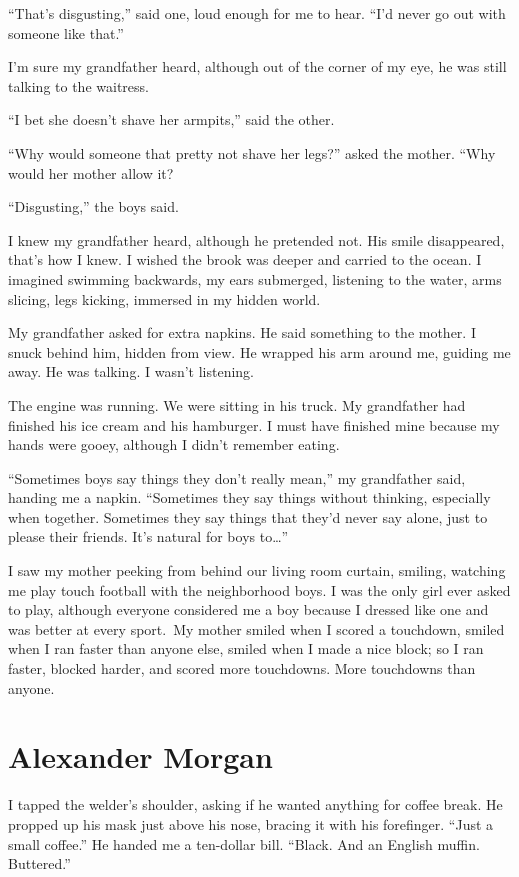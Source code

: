 ``That's disgusting,'' said one, loud enough for me to hear. ``I'd never
go out with someone like that.''

I'm sure my grandfather heard, although out of the corner of my eye, he
was still talking to the waitress.

``I bet she doesn't shave her armpits,'' said the other.

``Why would someone that pretty not shave her legs?'' asked the mother.
``Why would her mother allow it?

``Disgusting,'' the boys said. ~

I knew my grandfather heard, although he pretended not. His smile
disappeared, that's how I knew. I wished the brook was deeper and
carried to the ocean. I imagined swimming backwards, my ears submerged,
listening to the water, arms slicing, legs kicking, immersed in my
hidden world.

My grandfather asked for extra napkins. He said something to the mother.
I snuck behind him, hidden from view. He wrapped his arm around me,
guiding me away. He was talking. I wasn't listening.

The engine was running. We were sitting in his truck. My grandfather had
finished his ice cream and his hamburger. I must have finished mine
because my hands were gooey, although I didn't remember eating. ~

``Sometimes boys say things they don't really mean,'' my grandfather
said, handing me a napkin. ``Sometimes they say things without thinking,
especially when together. Sometimes they say things that they'd never
say alone, just to please their friends. It's natural for boys
to\ldots{}''

I saw my mother peeking from behind our living room curtain, smiling,
watching me play touch football with the neighborhood boys. I was the
only girl ever asked to play, although everyone considered me a boy
because I dressed like one and was better at every sport.~My mother
smiled when I scored a touchdown, smiled when I ran faster than anyone
else, smiled when I made a nice block; so I ran faster, blocked harder,
and scored more touchdowns. More touchdowns than anyone.

\chapter{Alexander Morgan}

\titlemark

I tapped the welder's shoulder, asking if he wanted anything for coffee
break. He propped up his mask just above his nose, bracing it with his
forefinger. ``Just a small coffee.'' He handed me a ten-dollar bill.
``Black. And an English muffin. Buttered.''

